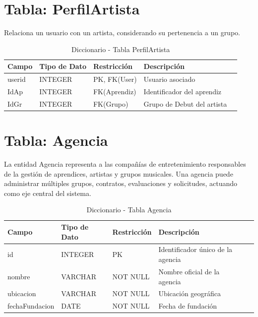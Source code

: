 \documentclass[12pt,a4paper,spanish,oneside]{report}
\begin{document}
\section{Tabla: PerfilArtista}
Relaciona un usuario con un artista, considerando su pertenencia a un grupo.
\begin{table}[H]
\centering
\caption{Diccionario - Tabla PerfilArtista}
\begin{tabular}{|l|l|l|l|l|}
\hline
\textbf{Campo} & \textbf{Tipo de Dato} & \textbf{Restricción} & \textbf{Descripción} \\
\hline
userid & INTEGER & PK, FK(User)& Usuario asociado \\
\hline
IdAp & INTEGER & FK(Aprendiz)& Identificador del aprendiz \\
\hline
IdGr & INTEGER & FK(Grupo) & Grupo de Debut del artista \\
\hline
\end{tabular}
\end{table}

\section{Tabla: Agencia}
La entidad Agencia representa a las compañías de entretenimiento responsables de
la gestión de aprendices, artistas y grupos musicales. Una agencia puede administrar
múltiples grupos, contratos, evaluaciones y solicitudes, actuando como eje central del
sistema.

\begin{table}[H]
\centering
\caption{Diccionario - Tabla Agencia}
\begin{tabular}{|l|l|l|l|l|}
\hline
\textbf{Campo} & \textbf{Tipo de Dato} & \textbf{Restricción} & \textbf{Descripción} \\
\hline
id & INTEGER & PK & Identificador único de la agencia \\
\hline
nombre & VARCHAR & NOT NULL & Nombre oficial de la agencia \\
\hline
ubicacion & VARCHAR & NOT NULL & Ubicación geográfica \\
\hline
fechaFundacion & DATE & NOT NULL & Fecha de fundación \\
\hline
\end{tabular}
\end{table}
\end{document}
